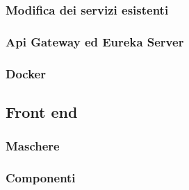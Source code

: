 \label{JointUtentiCrewRepository}
\label{JointUsciteCrewRepository}


\subsubsection{Modifica dei servizi esistenti}
\subsubsection{Api Gateway ed Eureka Server}
\subsubsection{Docker}

\subsection{Front end}
\subsubsection{Maschere}
\subsubsection{Componenti}